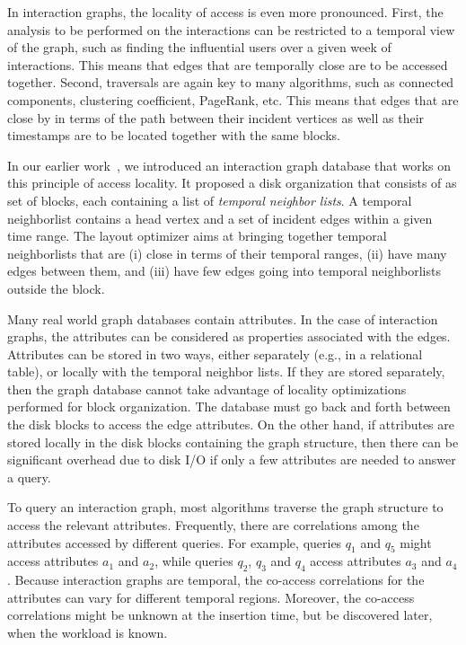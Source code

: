 In interaction graphs, the locality of access is even more pronounced. First, 
the analysis to be performed on the interactions can be restricted to a
temporal view of the graph, such as finding the influential users over a given
week of interactions. This means that edges that are temporally close are to
be accessed together. Second, traversals are again key to many algorithms,
such as connected components, clustering coefficient, PageRank, etc. This
means that edges that are close by in terms of the path between their incident
vertices as well as their timestamps are to be located together with the same
blocks. 

In our earlier work~\cite{gedik14}, we introduced an interaction graph database
that works on this principle of access locality. It proposed a disk
organization that consists of as set of blocks, each containing a list of
\emph{temporal neighbor lists}. A temporal neighborlist contains a head vertex
and a set of incident edges within a given time range. The layout optimizer
aims at bringing together temporal neighborlists that are (i) close in terms
of their temporal ranges, (ii) have many edges between them, and (iii) have
few edges going into temporal neighborlists outside the block.

Many real world graph databases contain attributes. In the case of interaction
graphs, the attributes can be considered as properties associated with the
edges. Attributes can be stored in two ways, either separately (e.g., in a
relational table), or locally with the temporal neighbor lists.  If they are
stored separately, then the graph database cannot take advantage of locality
optimizations performed for block organization. The database must go back and
forth between the disk blocks to access the edge attributes.  On the other
hand, if attributes are stored locally in the disk blocks containing the graph
structure, then there can be significant overhead due to disk I/O if only a
few attributes are needed to answer a query. 

To query an interaction graph, most algorithms traverse the graph structure to
access the relevant attributes.  Frequently, there are correlations among the
attributes accessed by different queries. For example, queries $q_1$ and $q_5$
might access attributes $a_1$ and $a_2$, while queries $q_2$, $q_3$ and $q_4$
access attributes $a_3$ and $a_4$. Because interaction graphs are temporal,
the co-access correlations for the attributes can vary for different temporal
regions.  Moreover, the co-access correlations might be unknown at the
insertion time, but be discovered later, when the workload is known.

